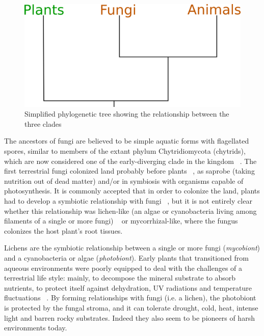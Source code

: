 \begin{figure}[htbp]
\centering
\includegraphics[keepaspectratio,width=\textwidth,height=0.75\textheight]{images/pfatree.png}
\caption{Simplified phylogenetic tree showing the relationship between the three clades}
\end{figure}

The ancestors of fungi are believed to be simple aquatic forms with flagellated spores, similar to members of the extant phylum Chytridiomycota (chytrids), which are now considered one of the early-diverging clade in the kingdom ~\citep{james2006}. The first terrestrial fungi colonized land probably before plants ~\citep{heckman2001}, as saprobe (taking nutrition out of dead matter) and\slash or in symbiosis with organisms capable of photosynthesis.
It is commonly accepted that in order to colonize the land, plants had to develop a symbiotic relationship with fungi ~\citep{selosse1998, heckman2001, bonneville2020}, but it is not entirely clear whether this relationship was lichen-like (an algae or cyanobacteria living among filaments of a single or more fungi) ~\citep{spribille2016} or mycorrhizal-like, where the fungus colonizes the host plant's root tissues.

Lichens are the symbiotic relationship between a single or more fungi (\emph{mycobiont}) and a cyanobacteria or algae (\emph{photobiont}). Early plants that transitioned from aqueous environments were poorly equipped to deal with the challenges of a terrestrial life style: mainly, to decompose the mineral substrate to absorb nutrients, to protect itself against dehydration, UV radiations and temperature fluctuations ~\citep{selosse1998, blackwell2000}. By forming relationships with fungi (i.e. a lichen), the photobiont is protected by the fungal stroma, and it can tolerate drought, cold, heat, intense light and barren rocky substrates. Indeed they also seem to be pioneers of harsh environments today.

